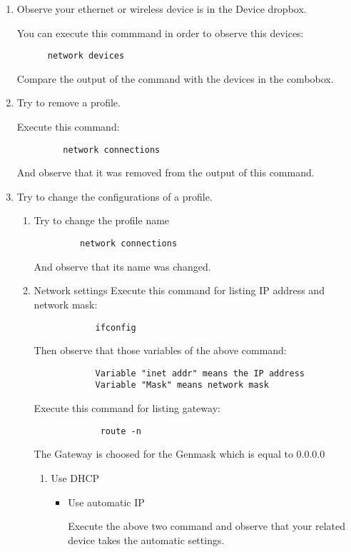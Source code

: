 \documentclass[a4paper,10pt]{article}
\begin{document}
\begin{enumerate}
      \begin{enumerate}
      \item Observe your ethernet or wireless device is in the Device dropbox.

	  You can execute this commmand in order to observe this devices:
	  \begin{verbatim}
	  network devices
	  \end{verbatim}
	  Compare the output of the command with the devices in the combobox.

      \item Try to remove a profile.
      
	    Execute this command:
	    \begin{verbatim}
	     network connections
	    \end{verbatim}
	    And observe that it was removed from the output of this command.

      \item Try to change the configurations of a profile.
	  \begin{enumerate}
	  \item Try to change the profile name
	    \begin{verbatim}
	     network connections
	    \end{verbatim}
	    And observe that its name was changed.

	  \item Network settings
	    Execute this command for listing IP address and network mask:
		  \begin{verbatim}
		    ifconfig
		  \end{verbatim}
	   Then observe that those variables of the above command:
		   \begin{verbatim}
		    Variable "inet addr" means the IP address
		    Variable "Mask" means network mask
		  \end{verbatim}
	   Execute this command for listing gateway:
	    	   \begin{verbatim}
		     route -n 
		  \end{verbatim}
	     The Gateway is choosed for the Genmask which is equal to 0.0.0.0
	

	      \begin{enumerate} 
	      \item Use DHCP
		\begin{itemize}
		  \item Use automatic IP
				      
		   Execute the above two command and observe that your related device takes the automatic settings. 


\end{itemize}
\end{enumerate}
\end{enumerate}
\end{enumerate}
\end{enumerate}
\end{document}
